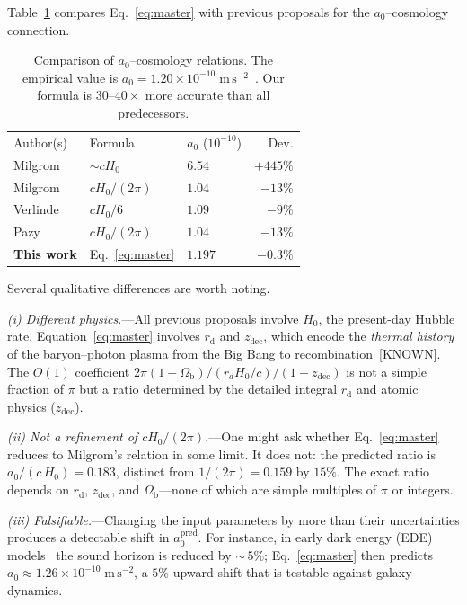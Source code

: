 \documentclass[prl,twocolumn,superscriptaddress,longbibliography]{revtex4-2}
\newcommand{\zdec}{z_{\mathrm{dec}}}
\newcommand{\rd}{r_{\mathrm{d}}}
\newcommand{\Ob}{\Omega_{\mathrm{b}}}
\newcommand{\azero}{a_0}
\newcommand{\ms}{\mathrm{m\,s}^{-2}}
\begin{document}
Table~\ref{tab:compare} compares
Eq.~\eqref{eq:master} with previous proposals for
the $\azero$--cosmology connection.

\begin{table}[t]
\centering
\caption{Comparison of $\azero$--cosmology relations.
The empirical value is
$\azero = 1.20 \times 10^{-10}\;\ms$~\cite{McGaugh2016}.
Our formula is $30$--$40\times$ more accurate than
all predecessors.}
\label{tab:compare}
\begin{ruledtabular}
\begin{tabular}{lllr}
Author(s) & Formula
  & $\azero$ ($10^{-10}$) & Dev. \\
\colrule
Milgrom~\cite{Milgrom1983}
  & $\sim\!cH_0$  & $6.54$ & $+445\%$ \\
Milgrom~\cite{Milgrom1999}
  & $cH_0/(2\pi)$ & $1.04$ & $-13\%$ \\
Verlinde~\cite{Verlinde2016}
  & $cH_0/6$      & $1.09$ & $-9\%$ \\
Pazy~\cite{Pazy2013}
  & $cH_0/(2\pi)$ & $1.04$ & $-13\%$ \\
\textbf{This work}
  & Eq.~\eqref{eq:master} & $\mathbf{1.197}$
  & $\mathbf{-0.3\%}$ \\
\end{tabular}
\end{ruledtabular}
\end{table}

Several qualitative differences are worth noting.

\emph{(i) Different physics.}---All previous proposals
involve $H_0$, the present-day Hubble rate.
Equation~\eqref{eq:master} involves $\rd$ and $\zdec$,
which encode the \emph{thermal history} of the
baryon--photon plasma from the Big Bang to
recombination~[KNOWN].
The $O(1)$ coefficient $2\pi(1+\Ob)/(r_d H_0/c)/(1+\zdec)$
is not a simple fraction of $\pi$ but a ratio determined
by the detailed integral $\rd$ and atomic
physics ($\zdec$).

\emph{(ii) Not a refinement of $cH_0/(2\pi)$.}---One might
ask whether Eq.~\eqref{eq:master} reduces to
Milgrom's relation in some limit.
It does not: the predicted ratio is
$\azero/(c\,H_0) = 0.183$, distinct from
$1/(2\pi) = 0.159$ by $15\%$.
The exact ratio depends on $\rd$, $\zdec$, and $\Ob$---none
of which are simple multiples of $\pi$ or integers.

\emph{(iii) Falsifiable.}---Changing the input
parameters by more than their uncertainties produces a
detectable shift in $\azero^{\mathrm{pred}}$.
For instance, in early dark energy (EDE)
models~\cite{Poulin2019} the sound horizon is reduced
by ${\sim}\,5\%$; Eq.~\eqref{eq:master} then predicts
$\azero \approx 1.26 \times 10^{-10}\;\ms$, a
$5\%$ upward shift that is testable against galaxy
dynamics.
\end{document}
